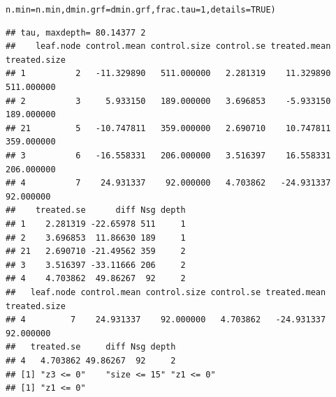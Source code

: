 \documentclass[smallextended]{svjour3}
\makeatletter
\newcommand{\hlnum}[1]{\textcolor[rgb]{0.686,0.059,0.569}{#1}}%
\newcommand{\hlstd}[1]{\textcolor[rgb]{0.345,0.345,0.345}{#1}}%
\newcommand{\hlkwc}[1]{\textcolor[rgb]{0.333,0.667,0.333}{#1}}%
\newenvironment{kframe}{%
 \def\at@end@of@kframe{}%
 \ifinner\ifhmode%
  \def\at@end@of@kframe{\end{minipage}}%
  \begin{minipage}{\columnwidth}%
 \fi\fi%
 \def\FrameCommand##1{\hskip\@totalleftmargin \hskip-\fboxsep
 \colorbox{shadecolor}{##1}\hskip-\fboxsep
     \hskip-\linewidth \hskip-\@totalleftmargin \hskip\columnwidth}%
 \MakeFramed {\advance\hsize-\width
   \@totalleftmargin\z@ \linewidth\hsize
   \@setminipage}}%
 {\par\unskip\endMakeFramed%
 \at@end@of@kframe}
\newenvironment{knitrout}{}{} %
\makeatother
\begin{document}
\begin{knitrout}
\begin{kframe}
\begin{alltt}
    \hlkwc{n.min} \hlstd{= n.min,} \hlkwc{dmin.grf} \hlstd{= dmin.grf,} \hlkwc{frac.tau} \hlstd{=} \hlnum{1}\hlstd{,} \hlkwc{details} \hlstd{=} \hlnum{TRUE}\hlstd{)}
\end{alltt}
\begin{verbatim}
## tau, maxdepth= 80.14377 2 
##    leaf.node control.mean control.size control.se treated.mean treated.size
## 1          2   -11.329890   511.000000   2.281319    11.329890   511.000000
## 2          3     5.933150   189.000000   3.696853    -5.933150   189.000000
## 21         5   -10.747811   359.000000   2.690710    10.747811   359.000000
## 3          6   -16.558331   206.000000   3.516397    16.558331   206.000000
## 4          7    24.931337    92.000000   4.703862   -24.931337    92.000000
##    treated.se      diff Nsg depth
## 1    2.281319 -22.65978 511     1
## 2    3.696853  11.86630 189     1
## 21   2.690710 -21.49562 359     2
## 3    3.516397 -33.11666 206     2
## 4    4.703862  49.86267  92     2
##   leaf.node control.mean control.size control.se treated.mean treated.size
## 4         7    24.931337    92.000000   4.703862   -24.931337    92.000000
##   treated.se     diff Nsg depth
## 4   4.703862 49.86267  92     2
## [1] "z3 <= 0"    "size <= 15" "z1 <= 0"   
## [1] "z1 <= 0"
\end{verbatim}
\end{kframe}
\end{knitrout}
\end{document}
